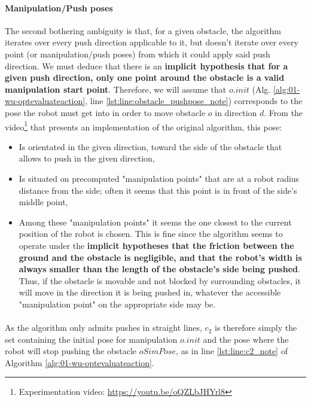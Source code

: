 \paragraph{Manipulation/Push poses}\label{obstacle_pushpose_note} The second bothering ambiguity is that, for a given obstacle, the algorithm iterates over every push direction applicable to it, but doesn't iterate over every point (or manipulation/push poses) from which it could apply said push direction. We must deduce that there is an \textbf{implicit hypothesis that for a given push direction, only one point around the obstacle is a valid manipulation start point}. Therefore, we will assume that $o.init$ (Alg. \ref{alg:01-wu-optevaluateaction}, line \ref{lst:line:obstacle_pushpose_note}) corresponds to the pose the robot must get into in order to move obstacle $o$ in direction $d$. From the video\footnote{Experimentation video: \url{https://youtu.be/oQZLbJHYrl8}} that presents an implementation of the original algorithm, this pose:

\begin{itemize}
  \item Is orientated in the given direction, toward the side of the obstacle that allows to push in the given direction,
  \item Is situated on precomputed "manipulation points" that are at a robot radius distance from the side; often it seems that this point is in front of the side's middle point,
  \item Among these "manipulation points" it seems the one closest to the current position of the robot is chosen. This is fine since the algorithm seems to operate under the \textbf{implicit hypotheses that the friction between the ground and the obstacle is negligible, and that the robot's width is always smaller than the length of the obstacle's side being pushed}. Thus, if the obstacle is movable and not blocked by surrounding obstacles, it will move in the direction it is being pushed in, whatever the accessible "manipulation point" on the appropriate side may be.
\end{itemize}

\paragraph{} As the algorithm only admits pushes in straight lines, $c_{2}$ is therefore simply the set containing the initial pose for manipulation $o.init$ and the pose where the robot will stop pushing the obstacle $oSimPose$, as in line \ref{lst:line:c2_note} of Algorithm \ref{alg:01-wu-optevaluateaction}.

